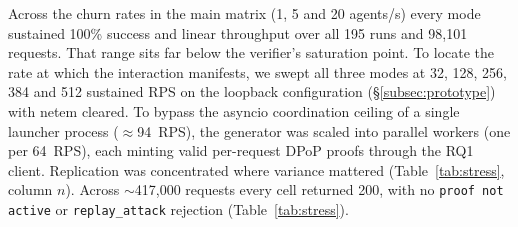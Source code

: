 \documentclass[conference]{IEEEtran}
\begin{document}
Across the churn rates in the main matrix (1, 5 and 20 agents/s) every mode sustained 100\% success and linear throughput over all 195 runs and 98{,}101 requests. That range sits far below the verifier's saturation point. To locate the rate at which the interaction manifests, we swept all three modes at 32, 128, 256, 384 and 512 sustained RPS on the loopback configuration (\S\ref{subsec:prototype}) with netem cleared. To bypass the asyncio coordination ceiling of a single launcher process ($\approx$94~RPS), the generator was scaled into parallel workers (one per 64~RPS), each minting valid per-request DPoP proofs through the RQ1 client. Replication was concentrated where variance mattered (Table~\ref{tab:stress}, column $n$). Across $\sim$417{,}000 requests every cell returned 200, with no \texttt{proof not active} or \texttt{replay\_attack} rejection (Table~\ref{tab:stress}).

\begin{table}[htbp]
\caption{Side-by-side stress sweep, authorization-server loopback, $n$ replications per cell at 30\,s record each, no netem, 100\% success. The p95 column reports the median p95 across replications, so a wide min--max bracket reflects dispersion across replications rather than within one run. Bolded cells mark the bimodal Mode-C cells (384 and 512 RPS).}
\label{tab:stress}
\centering
{}
\end{table}
\end{document}
